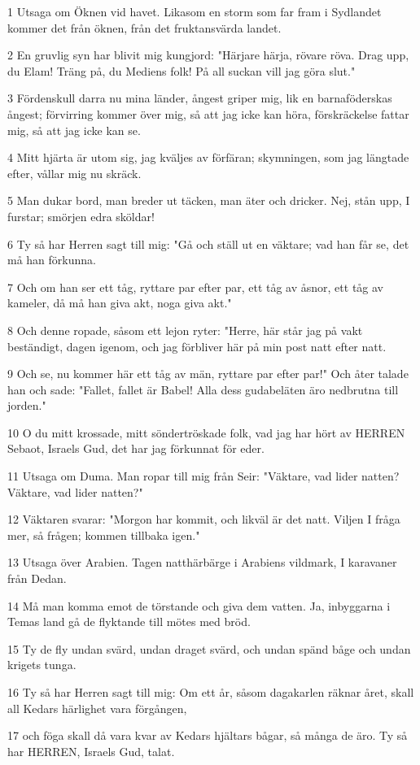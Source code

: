 \par 1 Utsaga om Öknen vid havet. Likasom en storm som far fram i Sydlandet kommer det från öknen, från det fruktansvärda landet.
\par 2 En gruvlig syn har blivit mig kungjord: "Härjare härja, rövare röva. Drag upp, du Elam! Träng på, du Mediens folk! På all suckan vill jag göra slut."
\par 3 Fördenskull darra nu mina länder, ångest griper mig, lik en barnaföderskas ångest; förvirring kommer över mig, så att jag icke kan höra, förskräckelse fattar mig, så att jag icke kan se.
\par 4 Mitt hjärta är utom sig, jag kväljes av förfäran; skymningen, som jag längtade efter, vållar mig nu skräck.
\par 5 Man dukar bord, man breder ut täcken, man äter och dricker. Nej, stån upp, I furstar; smörjen edra sköldar!
\par 6 Ty så har Herren sagt till mig: "Gå och ställ ut en väktare; vad han får se, det må han förkunna.
\par 7 Och om han ser ett tåg, ryttare par efter par, ett tåg av åsnor, ett tåg av kameler, då må han giva akt, noga giva akt."
\par 8 Och denne ropade, såsom ett lejon ryter: "Herre, här står jag på vakt beständigt, dagen igenom, och jag förbliver här på min post natt efter natt.
\par 9 Och se, nu kommer här ett tåg av män, ryttare par efter par!" Och åter talade han och sade: "Fallet, fallet är Babel! Alla dess gudabeläten äro nedbrutna till jorden."
\par 10 O du mitt krossade, mitt söndertröskade folk, vad jag har hört av HERREN Sebaot, Israels Gud, det har jag förkunnat för eder.
\par 11 Utsaga om Duma. Man ropar till mig från Seir: "Väktare, vad lider natten? Väktare, vad lider natten?"
\par 12 Väktaren svarar: "Morgon har kommit, och likväl är det natt. Viljen I fråga mer, så frågen; kommen tillbaka igen."
\par 13 Utsaga över Arabien. Tagen natthärbärge i Arabiens vildmark, I karavaner från Dedan.
\par 14 Må man komma emot de törstande och giva dem vatten. Ja, inbyggarna i Temas land gå de flyktande till mötes med bröd.
\par 15 Ty de fly undan svärd, undan draget svärd, och undan spänd båge och undan krigets tunga.
\par 16 Ty så har Herren sagt till mig: Om ett år, såsom dagakarlen räknar året, skall all Kedars härlighet vara förgången,
\par 17 och föga skall då vara kvar av Kedars hjältars bågar, så många de äro. Ty så har HERREN, Israels Gud, talat.

